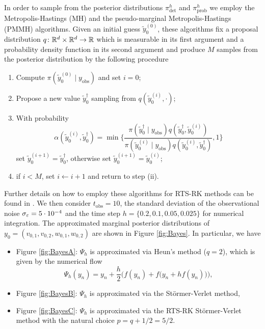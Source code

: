 \documentclass[10pt]{article}
\begin{document}
In order to sample from the posterior distributions $\pi^h_{\mathrm{det}}$ and $\pi^h_{\mathrm{prob}}$ we employ the Metropolis-Hastings (MH) and the pseudo-marginal Metropolis-Hastings (PMMH) algorithms. Given an initial guess $\tilde y_0^{(0)}$, these algorithms fix a proposal distribution $q \colon \mathbb{R}^d\times \mathbb{R}^d \to \mathbb{R}$ which is measurable in its first argument and a probability density function in its second argument and produce $M$ samples from the posterior distribution by the following procedure
\begin{enumerate}
	\item Compute $\pi(\tilde y_0^{(0)} \mid y_{\mathrm{obs}})$ and set $i = 0$;
	\item Propose a new value $\tilde y_0^{\dagger}$ sampling from $q(\tilde y_0^{(i)}, \cdot)$;
	\item With probability 
	\begin{equation}
		\alpha(\tilde y_0^{(i)}, \tilde y_0^{\dagger}) = \min\Big\{ \frac{\pi(\tilde y_0^\dagger \mid y_{\mathrm{obs}}) q(\tilde y_0^{\dagger}, \tilde y_0^{(i)})}
		{\pi(\tilde y_0^{(i)} \mid y_{\mathrm{obs}}) q(\tilde y_0^{(i)}, \tilde y_0^{\dagger})} , 1\Big\}
	\end{equation}
	set $\tilde y_0^{(i+1)} = \tilde y_0^{\dagger}$, otherwise set $\tilde y_0^{(i+1)} = \tilde y_0^{(i)}$;
	\item if $i < M$, set $i \leftarrow i + 1$ and return to step (ii).
\end{enumerate}
Further details on how to employ these algorithms for RTS-RK methods can be found in \cite{AbG18}. We then consider $t_{\mathrm{obs}} = 10$, the standard deviation of the observational noise $\sigma_\varepsilon = 5 \cdot 10^{-4}$ and the time step $h = \{0.2, 0.1, 0.05, 0.025\}$ for numerical integration. The approximated marginal posterior distributions of $ y_0 = (v_{0,1}, v_{0, 2}, w_{0, 1}, w_{0, 2})$ are shown in Figure \ref{fig:Bayes}. In particular, we have
\begin{itemize}[label = -]
	\item Figure \ref{fig:BayesA}: $\Psi_h$ is approximated via Heun's method \cite{Heu00} ($q = 2$), which is given by the numerical flow 
	\begin{equation*}
		\Psi_h(y_n) = y_n + \frac{h}{2}\Big(f(y_n) + f\big(y_n + hf(y_n)\big)\Big),
	\end{equation*}
	\item Figure \ref{fig:BayesB}: $\Psi_h$ is approximated via the Störmer-Verlet method,
	\item Figure \ref{fig:BayesC}: $\Psi_h$ is approximated via the RTS-RK Störmer-Verlet method with the natural choice $p = q+1/2 = 5/2$.
\end{itemize}
\end{document}
